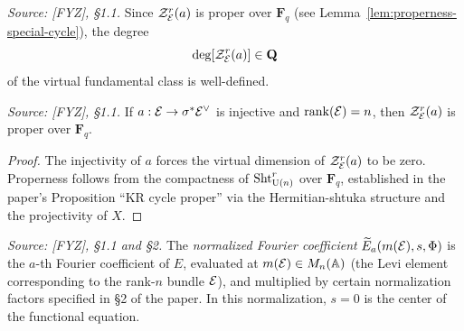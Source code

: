 \begin{definition}
  \label{def:degree-special-cycle}
  \textit{Source: [FYZ], \S1.1.}
  Since \(\mathcal{Z}_{\mathcal{E}}^r(a)\) is proper over \(\mathbf{F}_q\) (see
  Lemma~\ref{lem:properness-special-cycle}), the degree
  \[
    \deg[\mathcal{Z}_{\mathcal{E}}^r(a)] \in \mathbf{Q}
  \]
  of the virtual fundamental class is well-defined.
\end{definition}

\begin{lemma}
  \label{lem:properness-special-cycle}
  \textit{Source: [FYZ], \S1.1.}
  If \(a : \mathcal{E} \to \sigma^* \mathcal{E}^\vee\) is injective and \(\operatorname{rank}(\mathcal{E}) = n\), then
  \(\mathcal{Z}_{\mathcal{E}}^r(a)\) is proper over \(\mathbf{F}_q\).
\end{lemma}

\begin{proof}
  The injectivity of \(a\) forces the virtual dimension of \(\mathcal{Z}_{\mathcal{E}}^r(a)\) to be
  zero. Properness follows from the compactness of \(\operatorname{Sht}_{\operatorname{U}(n)}^r\) over
  \(\mathbf{F}_q\), established in the paper's Proposition ``KR cycle proper'' via the
  Hermitian-shtuka structure and the projectivity of \(X\).
\end{proof}

\begin{definition}
  \label{def:normalized-fourier-coeff}
  \textit{Source: [FYZ], \S1.1 and \S2.}
  The \emph{normalized Fourier coefficient}
  \(\widetilde{E}_a(m(\mathcal{E}), s, \Phi)\) is the \(a\)-th Fourier coefficient of \(E\),
  evaluated at \(m(\mathcal{E}) \in M_n(\mathbb{A})\) (the Levi element corresponding to the rank-\(n\)
  bundle \(\mathcal{E}\)), and multiplied by certain normalization factors specified in \S2 of
  the paper. In this normalization, \(s = 0\) is the center of the functional equation.
\end{definition}

